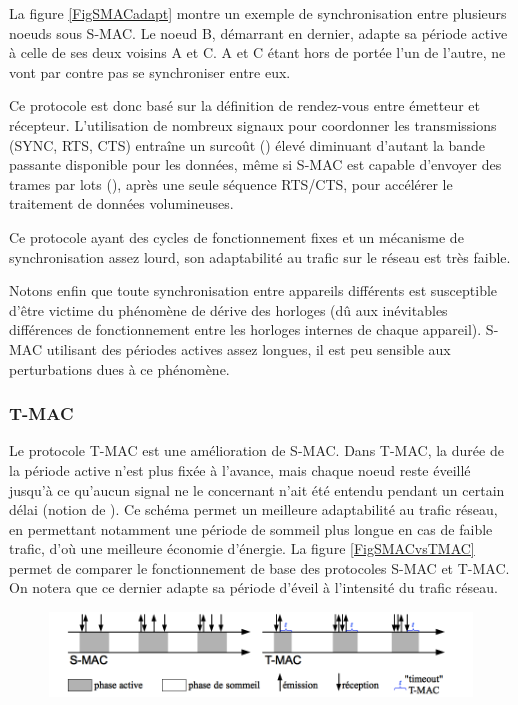 La figure \vref{FigSMACadapt} montre un exemple de synchronisation
entre plusieurs noeuds sous S-MAC. Le noeud B, démarrant en dernier, adapte
sa période active à celle de ses deux voisins A et C. A et C étant hors de
portée l'un de l'autre, ne vont par contre pas se synchroniser entre eux.

Ce protocole est donc basé sur la définition de rendez-vous entre
émetteur et récepteur. L'utilisation de nombreux signaux pour coordonner
les transmissions (SYNC, RTS, CTS) entraîne un surcoût ()
élevé diminuant d'autant la bande passante disponible pour les données,
même si S-MAC est capable d'envoyer des trames par lots (), après une seule séquence RTS/CTS, pour accélérer le traitement
de données volumineuses.

Ce protocole ayant des cycles de fonctionnement fixes et un mécanisme
de synchronisation assez lourd, son adaptabilité au trafic sur le réseau
est très faible.

Notons enfin que toute synchronisation entre appareils différents est
susceptible d'être victime du phénomène de dérive des horloges (dû aux
inévitables différences de fonctionnement entre les horloges internes
de chaque appareil). S-MAC utilisant des périodes actives assez longues,
il est peu sensible aux perturbations dues à ce phénomène. 

\subsubsection{T-MAC}
\label{ParTMAC}

Le protocole T-MAC \cite{TMAC} est une amélioration de S-MAC. Dans T-MAC,
la durée de la période active n'est plus fixée à l'avance, mais chaque
noeud reste éveillé jusqu'à ce qu'aucun signal ne le concernant n'ait
été entendu pendant un certain délai (notion de ).
Ce schéma permet un meilleure adaptabilité au trafic réseau, en permettant
notamment une période de sommeil plus longue en cas de faible trafic,
d'où une meilleure économie d'énergie. La figure \vref{FigSMACvsTMAC}
permet de comparer le fonctionnement de base des protocoles S-MAC et T-MAC.
On notera que ce dernier adapte sa période d'éveil à l'intensité du trafic
réseau.

\begin{figure}[!hbt]
\centering
\includegraphics[width=12.5cm]{images/ch3-s-mac-vs-t-mac.png}
\label{FigSMACvsTMAC}
\end{figure}

